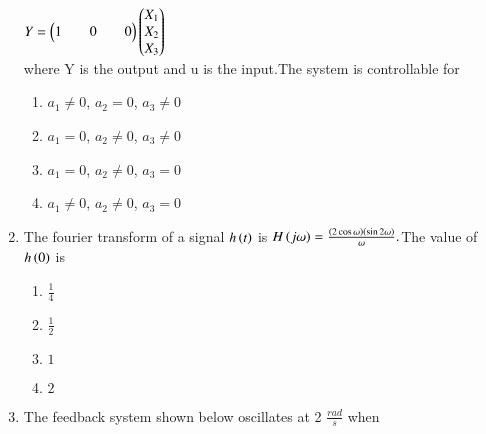 \documentclass[journal]{IEEEtran}
\begin{document}
\begin{enumerate}
                    $Y=\begin{pmatrix}1 && 0 && 0\end{pmatrix}\begin{pmatrix}X_{1}\\X_{2}\\X_{3}\end{pmatrix}$\\
        where Y is the output and u is the input.The system is controllable for 
        \begin{enumerate}
            \item$a_{1}\neq0$, $a_{2}=0$, $a_{3}\neq0$\\
            \item$a_{1}=0$, $a_{2}\neq0$, $a_{3}\neq0$\\
            \item$a_{1}=0$, $a_{2}\neq0$, $a_{3}=0$\\
            \item$a_{1}\neq0$, $a_{2}\neq0$, $a_{3}=0$ 
        \end{enumerate}
      \item The fourier transform of a signal $h\left(t\right)$ is $H\left(j\omega\right)=\frac{\left(2\cos{\omega}\right)\left(\sin {2\omega}\right)}{\omega}.$The value of $h\left(0\right)$ is 
       \begin{enumerate}
           \item$\frac{1}{4}$
           \item$\frac{1}{2}$
           \item$1$\\
          \item$2$
       \end{enumerate}
       \item The feedback system shown below oscillates at 2 $\frac{rad}{s}$ when\\
    

\end{enumerate}
\end{document}
